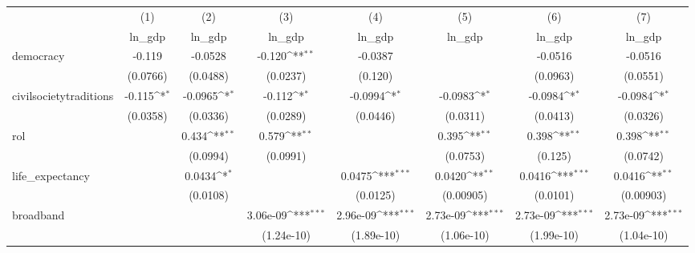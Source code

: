 {
\def\sym#1{\ifmmode^{#1}\else\(^{#1}\)\fi}
\begin{tabular}{l*{7}{c}}
\hline\hline
            &\multicolumn{1}{c}{(1)}&\multicolumn{1}{c}{(2)}&\multicolumn{1}{c}{(3)}&\multicolumn{1}{c}{(4)}&\multicolumn{1}{c}{(5)}&\multicolumn{1}{c}{(6)}&\multicolumn{1}{c}{(7)}\\
            &\multicolumn{1}{c}{ln\_gdp}&\multicolumn{1}{c}{ln\_gdp}&\multicolumn{1}{c}{ln\_gdp}&\multicolumn{1}{c}{ln\_gdp}&\multicolumn{1}{c}{ln\_gdp}&\multicolumn{1}{c}{ln\_gdp}&\multicolumn{1}{c}{ln\_gdp}\\
\hline
democracy   &      -0.119         &     -0.0528         &      -0.120\sym{**} &     -0.0387         &                     &     -0.0516         &     -0.0516         \\
            &    (0.0766)         &    (0.0488)         &    (0.0237)         &     (0.120)         &                     &    (0.0963)         &    (0.0551)         \\
[1em]
civilsocietytraditions&      -0.115\sym{*}  &     -0.0965\sym{*}  &      -0.112\sym{*}  &     -0.0994\sym{*}  &     -0.0983\sym{*}  &     -0.0984\sym{*}  &     -0.0984\sym{*}  \\
            &    (0.0358)         &    (0.0336)         &    (0.0289)         &    (0.0446)         &    (0.0311)         &    (0.0413)         &    (0.0326)         \\
[1em]
rol         &                     &       0.434\sym{**} &       0.579\sym{**} &                     &       0.395\sym{**} &       0.398\sym{**} &       0.398\sym{**} \\
            &                     &    (0.0994)         &    (0.0991)         &                     &    (0.0753)         &     (0.125)         &    (0.0742)         \\
[1em]
life\_expectancy&                     &      0.0434\sym{*}  &                     &      0.0475\sym{***}&      0.0420\sym{**} &      0.0416\sym{***}&      0.0416\sym{**} \\
            &                     &    (0.0108)         &                     &    (0.0125)         &   (0.00905)         &    (0.0101)         &   (0.00903)         \\
[1em]
broadband   &                     &                     &    3.06e-09\sym{***}&    2.96e-09\sym{***}&    2.73e-09\sym{***}&    2.73e-09\sym{***}&    2.73e-09\sym{***}\\
            &                     &                     &  (1.24e-10)         &  (1.89e-10)         &  (1.06e-10)         &  (1.99e-10)         &  (1.04e-10)         \\

\end{tabular}}
